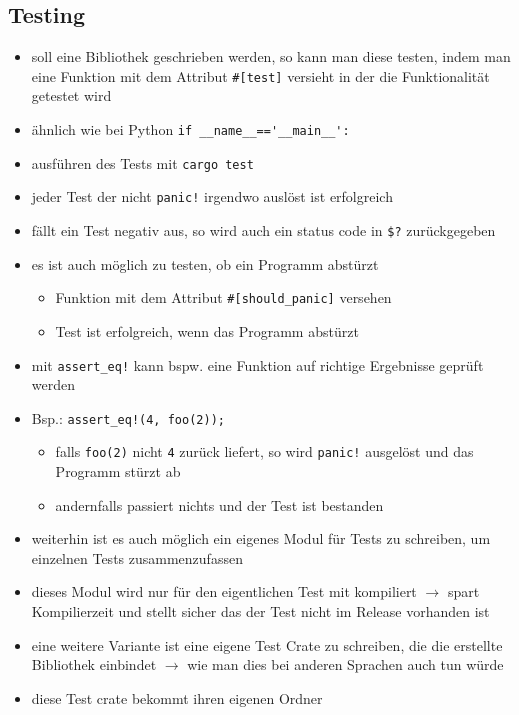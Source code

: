 \documentclass[a4paper,12pt]{article}
\begin{document}
\subsection{Testing}
	\begin{itemize}
	  \item soll eine Bibliothek geschrieben werden, so kann man diese testen, indem man eine Funktion mit dem Attribut \verb|#[test]| versieht in der die Funktionalität getestet wird
	  \item ähnlich wie bei Python \verb|if __name__=='__main__':|
	  \item ausführen des Tests mit \verb|cargo test|
	  \item jeder Test der nicht \verb|panic!| irgendwo auslöst ist erfolgreich
	  \item fällt ein Test negativ aus, so wird auch ein status code in \verb|$?| zurückgegeben
	  \item es ist auch möglich zu testen, ob ein Programm abstürzt
	  	\begin{itemize}
	  	  \item Funktion mit dem Attribut \verb|#[should_panic]| versehen
	  	  \item Test ist erfolgreich, wenn das Programm abstürzt
	  	\end{itemize}
	 \item mit \verb|assert_eq!| kann bspw. eine Funktion auf richtige Ergebnisse geprüft werden 
	 \item Bsp.:  \verb|assert_eq!(4, foo(2));|
	 	\begin{itemize}
	 	  \item falls \verb|foo(2)| nicht \verb|4| zurück liefert, so wird \verb|panic!| ausgelöst und das Programm stürzt ab
	 	  \item andernfalls passiert nichts und der Test ist bestanden
	 	\end{itemize}
	 \item weiterhin ist es auch möglich ein eigenes Modul für Tests zu schreiben, um einzelnen Tests zusammenzufassen 
	 \item dieses Modul wird nur für den eigentlichen Test mit kompiliert $\rightarrow$ spart Kompilierzeit  und stellt sicher das der Test nicht im Release vorhanden ist
	 \item eine weitere Variante ist eine eigene Test Crate zu schreiben, die die erstellte Bibliothek einbindet $\rightarrow$ wie man dies bei anderen Sprachen auch tun würde
	 \item diese Test crate bekommt ihren eigenen Ordner
	\end{itemize}
\end{document}
